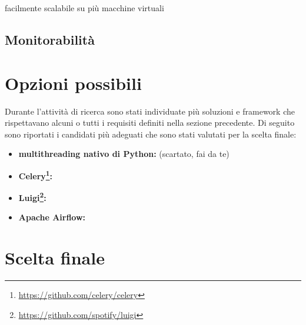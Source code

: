 facilmente scalabile su più macchine virtuali

\subsection{Monitorabilità}
\label{sub:monitorable}

\lipsum[1]

\section{Opzioni possibili}
\label{sec:opzioni_possibili}

Durante l'attività di ricerca sono stati individuate più soluzioni e framework
che rispettavano alcuni o tutti i requisiti definiti nella sezione precedente. Di
seguito sono riportati i candidati più adeguati che sono stati valutati per la scelta
finale:
\begin{itemize}
  \item \textbf{multithreading nativo di Python:} (scartato, fai da te) \lipsum[1]

  \item \textbf{Celery\footnote{\url{https://github.com/celery/celery}}:}
    \lipsum[1]

  \item \textbf{Luigi\footnote{\url{https://github.com/spotify/luigi}}:} \lipsum[1]

  \item \textbf{Apache Airflow\cite{airflow}:} \lipsum[1]
\end{itemize}

\section{Scelta finale}
\label{sec:scelta_finale}

\lipsum[1]